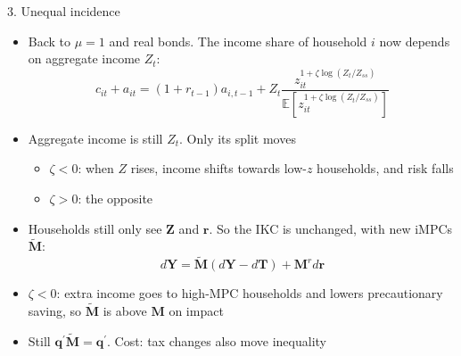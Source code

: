 \documentclass[10pt,english]{beamer}
\begin{document}
%
\begin{frame}{3. Unequal incidence}
\vspace{-1mm}
\begin{itemize}
\item <+->Back to $\mu=1$ and real bonds. The income share of household $i$ now depends on aggregate income $Z_{t}$:
\[
c_{it}+a_{it}=(1+r_{t-1})a_{i,t-1}+Z_{t}\frac{z_{it}^{1+\zeta\log\left(Z_{t}/Z_{ss}\right)}}{\mathbb{E}\left[z_{it}^{1+\zeta\log\left(Z_{t}/Z_{ss}\right)}\right]}
\]
\item <+->Aggregate income is still $Z_{t}$. Only its split moves
\begin{itemize}
\item $\zeta<0$: when $Z$ rises, income shifts towards low-$z$ households, and risk falls
\item $\zeta>0$: the opposite
\end{itemize}
\item <+->Households still only see $\boldsymbol{Z}$ and $\boldsymbol{r}$. So the IKC is unchanged, with new iMPCs $\tilde{\boldsymbol{M}}$:
\[
d\boldsymbol{Y}=\tilde{\boldsymbol{M}}\left(d\boldsymbol{Y}-d\boldsymbol{T}\right)+\boldsymbol{M}^{r}d\boldsymbol{r}
\]
\item <+->$\zeta<0$: extra income goes to high-MPC households and lowers precautionary saving, so $\tilde{\boldsymbol{M}}$ is above $\boldsymbol{M}$ on impact
\item <+->Still $\boldsymbol{q}^{\prime}\tilde{\boldsymbol{M}}=\boldsymbol{q}^{\prime}$. Cost: tax changes also move inequality
\end{itemize}
\end{frame}
%
\end{document}

